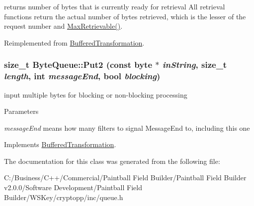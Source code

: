 returns number of bytes that is currently ready for retrieval All retrieval functions return the actual number of bytes retrieved, which is the lesser of the request number and \hyperlink{class_byte_queue_a56f851da4a1e9518c2b7005807aecab8}{MaxRetrievable()}. 

Reimplemented from \hyperlink{class_buffered_transformation_adf6654e3996270394552d67d2fda95d7}{BufferedTransformation}.\hypertarget{class_byte_queue_a684942d5641278a78e7c237a5bd4c69d}{
\subsubsection[{Put2}]{\setlength{\rightskip}{0pt plus 5cm}size\_\-t ByteQueue::Put2 (const byte $\ast$ {\em inString}, \/  size\_\-t {\em length}, \/  int {\em messageEnd}, \/  bool {\em blocking})}}
\label{class_byte_queue_a684942d5641278a78e7c237a5bd4c69d}


input multiple bytes for blocking or non-\/blocking processing 
\begin{DoxyParams}{Parameters}
\item[{\em messageEnd}]means how many filters to signal MessageEnd to, including this one \end{DoxyParams}


Implements \hyperlink{class_buffered_transformation_ad396dcb42260f23125a35ec0e5d17d55}{BufferedTransformation}.

The documentation for this class was generated from the following file:\begin{DoxyCompactItemize}
\item 
C:/Business/C++/Commercial/Paintball Field Builder/Paintball Field Builder v2.0.0/Software Development/Paintball Field Builder/WSKey/cryptopp/inc/queue.h\end{DoxyCompactItemize}
